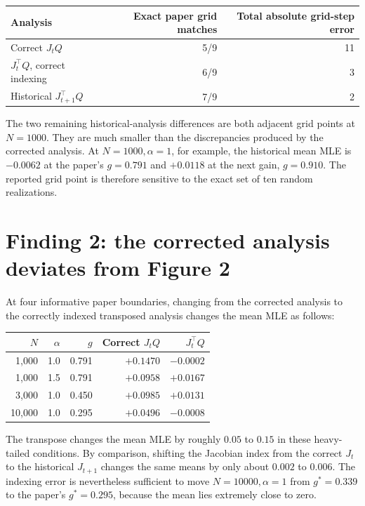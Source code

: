 \documentclass[11pt]{article}
\begin{document}
\begin{center}
\begin{tabular}{lrr}
\toprule
Analysis & Exact paper grid matches & Total absolute grid-step error \\
\midrule
Correct $J_tQ$ & 5/9 & 11 \\
$J_t^\top Q$, correct indexing & 6/9 & 3 \\
Historical $J_{t+1}^\top Q$ & 7/9 & 2 \\
\bottomrule
\end{tabular}
\end{center}

The two remaining historical-analysis differences are both adjacent grid
points at $N=1000$. They are much smaller than the discrepancies produced by
the corrected analysis. At $N=1000,\alpha=1$, for example, the historical
mean MLE is $-0.0062$ at the paper's $g=0.791$ and $+0.0118$ at the next
gain, $g=0.910$. The reported grid point is therefore sensitive to the exact
set of ten random realizations.

\section{Finding 2: the corrected analysis deviates from Figure 2}

At four informative paper boundaries, changing from the corrected analysis to
the correctly indexed transposed analysis changes the mean MLE as follows:

\begin{center}
\begin{tabular}{rrrrr}
\toprule
$N$ & $\alpha$ & $g$ & Correct $J_tQ$ & $J_t^\top Q$ \\
\midrule
1,000 & 1.0 & 0.791 & $+0.1470$ & $-0.0002$ \\
1,000 & 1.5 & 0.791 & $+0.0958$ & $+0.0167$ \\
3,000 & 1.0 & 0.450 & $+0.0985$ & $+0.0131$ \\
10,000 & 1.0 & 0.295 & $+0.0496$ & $-0.0008$ \\
\bottomrule
\end{tabular}
\end{center}

The transpose changes the mean MLE by roughly $0.05$ to $0.15$ in these
heavy-tailed conditions. By comparison, shifting the Jacobian index from the
correct $J_t$ to the historical $J_{t+1}$ changes the same means by only
about $0.002$ to $0.006$. The indexing error is nevertheless sufficient to
move $N=10000,\alpha=1$ from $g^*=0.339$ to the paper's $g^*=0.295$,
because the mean lies extremely close to zero.
\end{document}
